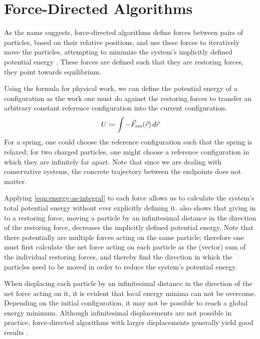 \section{Force-Directed Algorithms}
\label{sect:force-directed-algorithms}

As the name suggests, force-directed algorithms define forces between pairs of particles, based on their relative positions, and use these forces to iteratively move the particles, attempting to minimize the system's implicitly defined potential energy \cite{Kobourov}. These forces are defined such that they are restoring forces, \ie{} they point towards equilibrium.

Using the formula for physical work, we can define the potential energy of a configuration as the work one must do against the restoring forces to transfer an arbitrary constant reference configuration into the current configuration.
%
\begin{equation}
  U \coloneqq \int -\vec{F}_\text{res}(\vec{r}) \mathop{d \vec{r}}
  \label{eqn:energy-as-integral}
\end{equation}
%
For a spring, one could choose the reference configuration such that the spring is relaxed; for two charged particles, one might choose a reference configuration in which they are infinitely far apart. Note that since we are dealing with conservative systems, the concrete trajectory between the endpoints does not matter.

Applying \cref{eqn:energy-as-integral} to each force allows us to calculate the system's total potential energy without ever explicitly defining it.  also shows that giving in to a restoring force, \ie{} moving a particle by an infinitesimal distance in the direction of the restoring force, decreases the implicitly defined potential energy. Note that there potentially are multiple forces acting on the same particle; therefore one must first calculate the net force acting on each particle as the (vector) sum of the individual restoring forces, and thereby find the direction in which the particles need to be moved in order to reduce the system's potential energy.

When displacing each particle by an infinitesimal distance in the direction of the net force acting on it, it is evident that local energy minima can not be overcome. Depending on the initial configuration, it may not be possible to reach a global energy minimum. Although infinitesimal displacements are not possible in practice, force-directed algorithms with larger displacements generally yield good results \cite{Kobourov}.





